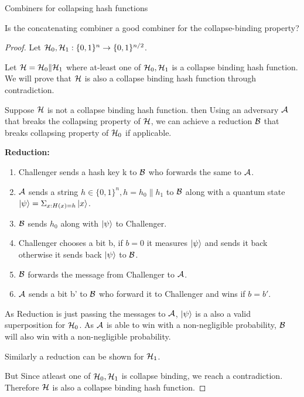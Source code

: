 \begin{solution}{Combiners for collapsing hash functions}\label{ques:x}
    \begin{question}
    Is the concatenating combiner a good combiner for the collapse-binding property?
    \end{question}
    \tcblower{}
    \begin{proof}
    Let $\mathcal{H}_0,\mathcal{H}_1 : \{0,1\}^n \rightarrow\{0,1\}^{n/2}$.
    
    Let $\mathcal{H} = \mathcal{H}_0 \| \mathcal{H}_1$ where at-least one of $\mathcal{H}_0,\mathcal{H}_1$ is a collapse binding hash function. We will prove that $\mathcal{H}$ is also a collapse binding hash function through contradiction.

    Suppose $\mathcal{H}$ is not a collapse binding hash function. then Using an adversary $\mathcal{A}$ that breaks the collapsing property of $\mathcal{H}$, we can achieve a reduction $\mathcal{B}$ that breaks collapsing property of $\mathcal{H}_0$ if applicable.

    \textbf{Reduction:}

    \begin{enumerate}
        \item Challenger sends a hash key k to $\mathcal{B}$ who forwards the same to $\mathcal{A}$.
        \item $\mathcal{A}$ sends a string $h \in \{0,1\}^n, h=h_0\|h_1$ to $\mathcal{B}$ along with a quantum state $\ket{\psi} = \Sigma_{x:H(x) =h}\ket{x}$.
        \item $\mathcal{B}$ sends $h_0$ along with $\ket{\psi}$ to Challenger.
        \item Challenger chooses a bit b, if $b=0$ it measures $\ket{\psi}$ and sends it back otherwise it sends back $\ket{\psi}$ to $\mathcal{B}$.
        \item $\mathcal{B}$ forwards the message from Challenger to $\mathcal{A}$.
        \item $\mathcal{A}$ sends a bit b' to $\mathcal{B}$ who forward it to Challenger and wins if $b=b'$.
    \end{enumerate}

    As Reduction is just passing the messages to $\mathcal{A}$, $\ket{\psi}$ is a also a valid superposition for $\mathcal{H}_0$. As $\mathcal{A}$ is able to win with a non-negligible probability, $\mathcal{B}$ will also win with a non-negligible probability.

    Similarly a reduction can be shown for $\mathcal{H}_1$.

    But Since atleast one of $\mathcal{H}_0,\mathcal{H}_1$ is collapse binding, we reach a contradiction. Therefore $\mathcal{H}$ is also a collapse binding hash function.
    
    \end{proof}
\end{solution}
 